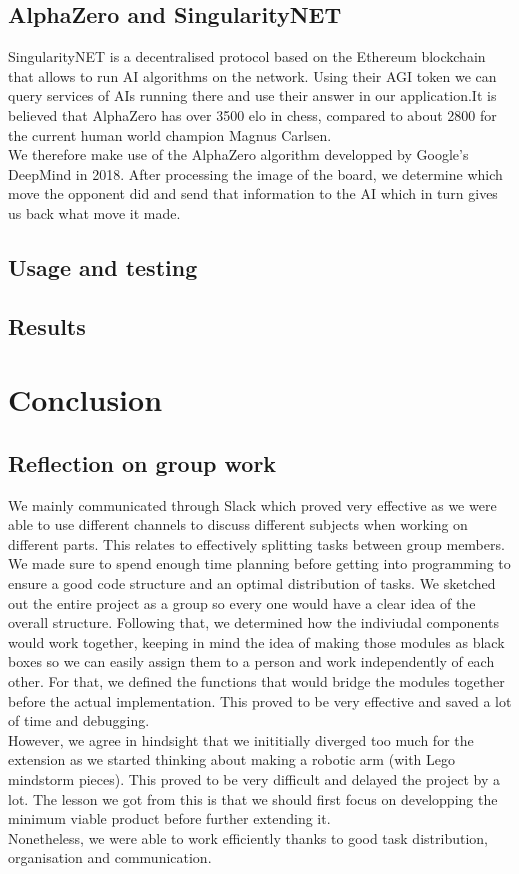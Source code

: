 \documentclass[11pt]{article}
\begin{document}
\subsection{AlphaZero and SingularityNET}

SingularityNET is a decentralised protocol based on the Ethereum blockchain that
allows to run AI algorithms on the network. Using their AGI token we can query
services of AIs running there and use their answer in our application.It is
believed that AlphaZero has over 3500 elo in chess, compared to about 2800 for
the current human world champion Magnus Carlsen.\\ We therefore make use of the
AlphaZero algorithm developped by Google's DeepMind in 2018. After processing
the image of the board, we determine which move the opponent did and send that
information to the AI which in turn gives us back what move it made.

\subsection{Usage and testing}
\subsection{Results}
\section{Conclusion}
\subsection{Reflection on group work}
We mainly communicated through Slack which proved very effective as we were able
to use different channels to discuss different subjects when working on
different parts. This relates to effectively splitting tasks between group
members. We made sure to spend enough time planning before getting into
programming to ensure a good code structure and an optimal distribution of
tasks. We sketched out the entire project as a group so every one would have a
clear idea of the overall structure. Following that, we determined how the
indiviudal components would work together, keeping in mind the idea of making
those modules as black boxes so we can easily assign them to a person and work
independently of each other. For that, we defined the functions that would
bridge the modules together before the actual implementation. This proved to be
very effective and saved a lot of time and debugging.\\
However, we agree in hindsight that we inititially diverged too much for the
extension as we started thinking about making a robotic arm (with Lego mindstorm
pieces). This proved to be very difficult and delayed the project by a lot. The
lesson we got from this is that we should first focus on developping the minimum
viable product before further extending it.\\
Nonetheless, we were able to work efficiently thanks to good task distribution,
organisation and communication.
\end{document}
